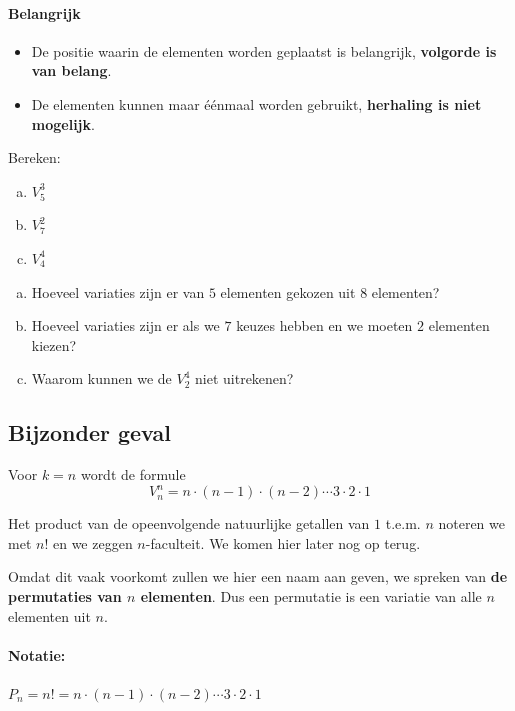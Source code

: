 \documentclass[12pt,a4paper,twoside]{article}
\begin{document}
\paragraph*{Belangrijk}
\begin{itemize}
  \item De positie waarin de elementen worden geplaatst is belangrijk, {\bf volgorde is van belang}.
  \item De elementen kunnen maar éénmaal worden gebruikt, {\bf herhaling is niet mogelijk}.
\end{itemize}

\begin{oefening}
Bereken:
\begin{multicols}{3}
\begin{enumerate}[(a)]
  \item $V^3_5$
  \item $V^2_7$
  \item $V^4_4$
\end{enumerate}
\end{multicols}
\end{oefening}

\begin{oefening}
\begin{enumerate}[(a)]
  \item Hoeveel variaties zijn er van $5$ elementen gekozen uit $8$ elementen?
  \item Hoeveel variaties zijn er als we $7$ keuzes hebben en we moeten $2$ elementen kiezen?
  \item Waarom kunnen we de $V^4_2$ niet uitrekenen?
  \end{enumerate}
\end{oefening}

\subsection{Bijzonder geval}

Voor $k=n$ wordt de formule
\[V^n_n = n \cdot (n-1) \cdot (n-2) \cdots 3 \cdot 2 \cdot 1\]

Het product van de opeenvolgende natuurlijke getallen van $1$ t.e.m. $n$ noteren we met $n!$ en we zeggen $n$-faculteit. We komen hier later nog op terug.

Omdat dit vaak voorkomt zullen we hier een naam aan geven, we spreken van {\bf de permutaties van $n$ elementen}. Dus een permutatie is een variatie van alle $n$ elementen uit $n$.

\paragraph*{Notatie:} $P_n = n! = n \cdot (n-1) \cdot (n-2) \cdots 3 \cdot 2 \cdot 1$
\end{document}
